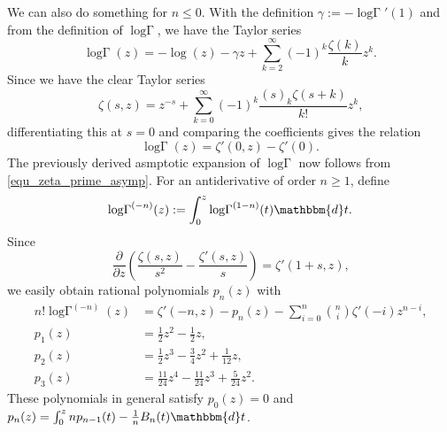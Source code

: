 \documentclass[12pt]{article}
\newcommand{\logG} {\operatorname {log \Gamma}}
\newcommand{\dd}[0] {\mathbbm{d}}
\numberwithin{equation}{section}
\begin{document}
We can also do something for $n \le 0$. With the definition $\gamma := - \logG'(1)$ and from the definition of $\logG$, we have the Taylor series 
\begin{equation*}
\logG (z) = -\log(z) - \gamma z + \sum_{k=2}^{\infty} (-1)^k \frac{\zeta(k)}{k} z^k\text{.}
\end{equation*}
Since we have the clear Taylor series
\begin{equation*}
\zeta(s,z) = z^{-s} + \sum_{k=0}^{\infty} (-1)^k \frac{(s)_k \zeta(s+k)}{k!} z^k\text{,} 
\end{equation*}
differentiating this at $s=0$ and comparing the coefficients gives the relation
\begin{equation*}
\logG(z) = \zeta'(0,z) - \zeta'(0)\text{.}
\end{equation*}
The previously derived asmptotic expansion of $\logG$ now follows from \eqref{equ_zeta_prime_asymp}. For an antiderivative of order $n \ge 1$, define
\begin{equation*}
\logG^{(-n)}(z) := \int_0^z \logG^{(1-n)}(t) \dd t\text{.}
\end{equation*}
Since
\begin{equation*}
\frac{\partial}{\partial z} \left( \frac{\zeta(s,z)}{s^2} - \frac{\zeta'(s,z)}{s}\right) = \zeta'(1+s,z)\text{,}
\end{equation*}
we easily obtain rational polynomials $p_n(z)$ with
\begin{align*}
n! \logG^{(-n)}(z) &= \zeta'(-n,z) - p_n(z) - \sum_{i=0}^{n} \binom{n}{i} \zeta'(-i) z^{n-i}\text{,}\\
p_1(z) &= \tfrac{1}{2} z^2 - \tfrac{1}{2} z\text{,}\\
p_2(z) &= \tfrac{1}{2} z^3 -\tfrac{3}{4} z^2 + \tfrac{1}{12} z \text{,}\\
p_3(z) &= \tfrac{11}{24} z^4 - \tfrac{11}{24} z^3 + \tfrac{5}{24} z^2\text{.}
\end{align*}
These polynomials in general satisfy $p_0(z) = 0$ and $
p_n(z) = \int_0^{z} n p_{n-1}(t) - \tfrac{1}{n} B_n(t) \dd t$.
\end{document}
